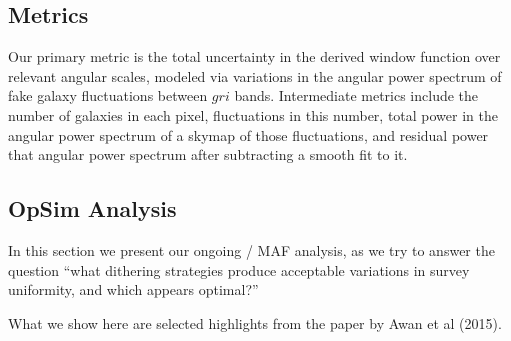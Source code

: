 
\subsection{Metrics}
\label{sec:\secname:metrics}


Our primary metric is the total uncertainty in the derived window function
over relevant angular scales, modeled via variations in the angular
power spectrum of fake galaxy fluctuations between $gri$ bands.
Intermediate metrics include the number of galaxies in each pixel,
fluctuations in this number, total power in the angular power spectrum
of a skymap of those fluctuations, and residual power that angular power
spectrum after subtracting a smooth fit to it.



\subsection{OpSim Analysis}
\label{sec:\secname:analysis}

In this section we present our ongoing \OpSim / MAF analysis, as we try
to answer the question ``what dithering strategies produce acceptable
variations in survey uniformity, and which appears optimal?''

What we show here are selected highlights from the paper by Awan et al (2015).







%


